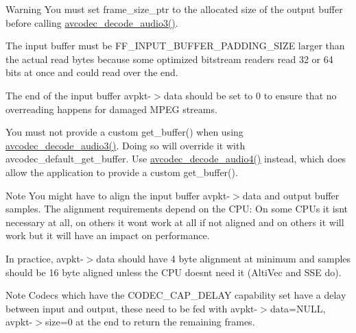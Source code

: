 \begin{DoxyWarning}{Warning}
You must set frame\+\_\+size\+\_\+ptr to the allocated size of the output buffer before calling \hyperlink{group__lavc__decoding_gac552241713bbc0eae2206a75d211daf4}{avcodec\+\_\+decode\+\_\+audio3()}.

The input buffer must be F\+F\+\_\+\+I\+N\+P\+U\+T\+\_\+\+B\+U\+F\+F\+E\+R\+\_\+\+P\+A\+D\+D\+I\+N\+G\+\_\+\+S\+I\+ZE larger than the actual read bytes because some optimized bitstream readers read 32 or 64 bits at once and could read over the end.

The end of the input buffer avpkt-\/$>$data should be set to 0 to ensure that no overreading happens for damaged M\+P\+EG streams.

You must not provide a custom get\+\_\+buffer() when using \hyperlink{group__lavc__decoding_gac552241713bbc0eae2206a75d211daf4}{avcodec\+\_\+decode\+\_\+audio3()}. Doing so will override it with avcodec\+\_\+default\+\_\+get\+\_\+buffer. Use \hyperlink{group__lavc__decoding_ga834bb1b062fbcc2de4cf7fb93f154a3e}{avcodec\+\_\+decode\+\_\+audio4()} instead, which does allow the application to provide a custom get\+\_\+buffer().
\end{DoxyWarning}
\begin{DoxyNote}{Note}
You might have to align the input buffer avpkt-\/$>$data and output buffer samples. The alignment requirements depend on the C\+PU\+: On some C\+P\+Us it isn\textquotesingle{}t necessary at all, on others it won\textquotesingle{}t work at all if not aligned and on others it will work but it will have an impact on performance.
\end{DoxyNote}
In practice, avpkt-\/$>$data should have 4 byte alignment at minimum and samples should be 16 byte aligned unless the C\+PU doesn\textquotesingle{}t need it (Alti\+Vec and S\+SE do).

\begin{DoxyNote}{Note}
Codecs which have the C\+O\+D\+E\+C\+\_\+\+C\+A\+P\+\_\+\+D\+E\+L\+AY capability set have a delay between input and output, these need to be fed with avpkt-\/$>$data=N\+U\+LL, avpkt-\/$>$size=0 at the end to return the remaining frames.
\end{DoxyNote}

